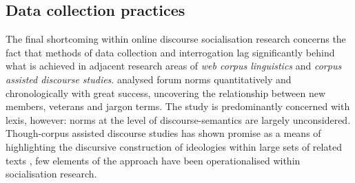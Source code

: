 
	  \subsection{Data collection practices}

		 The final shortcoming within online discourse socialisation research concerns the fact that methods of data collection and interrogation lag significantly behind what is achieved in adjacent research areas of \emph{web corpus linguistics} and \emph{corpus assisted discourse studies}. \textcite{danescu-niculescu-mizil_no_2013} analysed forum norms quantitatively and chronologically with great success, uncovering the relationship between new members, veterans and jargon terms. The study is predominantly concerned with lexis, however: norms at the level of discourse-semantics are largely unconsidered. Though-corpus assisted discourse studies has shown promise as a means of highlighting the discursive construction of ideologies within large sets of related texts \cite[e.g.][]{koteyko_climate_2013,salama_ideological_2011}, few elements of the approach have been operationalised within socialisation research.


